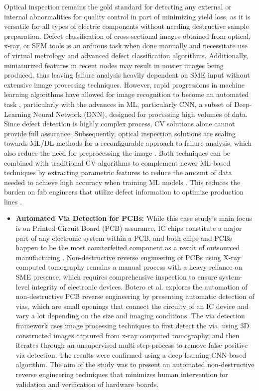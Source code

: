 Optical inspection remains the gold standard for detecting any external or internal abnormalities for quality control in part of minimizing yield loss, as it is versatile for all types of electric components without needing destructive sample preparation. Defect classification of cross-sectional images obtained from optical, x-ray, or SEM tools is an arduous task when done manually and necessitate use of virtual metrology and advanced defect classification algorithms. Additionally, miniaturized features in recent nodes may result in noisier images being produced, thus leaving failure analysis heavily dependent on SME input without extensive image processing techniques. However, rapid progressions in machine learning algorithms have allowed for image recognition to become an automated task \cite{Silva2019-bw}, particularly with the advances in ML, particularly CNN, a subset of Deep-Learning Neural Network (DNN), designed for processing high volumes of data. Since defect detection is highly complex process, CV solutions alone cannot provide full assurance. Subsequently, optical inspection solutions are scaling towards ML/DL methods for a reconfigurable approach to failure analysis, which also reduce the need for preprocessing the image \cite{Jessurun2022-vr, Yang2021-bz}. Both techniques can be combined with traditional CV algorithms to complement newer ML-based techniques by extracting parametric features to reduce the amount of data needed to achieve high accuracy when training ML models \cite{Zhao2022-ee}. This reduces the burden on fab engineers that utilize defect information to optimize production lines \cite{Peters2022-wd}.

\begin{itemize}
 \item \textbf{Automated Via Detection for PCBs:}
While this case study's main focus is on Printed Circuit Board (PCB) assurance, IC chips constitute a major part of any electronic system within a PCB, and both chips and PCBs happen to be the most counterfeited component as a result of outsourced manufacturing \cite{Sathiaseelan2021-zh}. Non-destructive reverse engineering of PCBs using X-ray computed tomography remains a 
manual process with a heavy reliance on SME presence, which requires comprehensive inspection to ensure system-level integrity of electronic devices. Botero et al. \cite{Botero2020-pl} explores the automation of non-destructive PCB reverse engineering by
presenting automatic detection of vias, which are small openings that connect the circuity of an IC device and vary a lot depending on
the size and imaging conditions. The via detection framework uses image processing techniques to first detect the via, using 3D constructed images captured from x-ray computed tomography, and then iterates through an unsupervised multi-step process to remove false-positive via detection. The results were confirmed using a deep learning CNN-based algorithm. The aim of the study was to present an automated non-destructive reverse engineering techniques that minimizes human     intervention for validation and verification of  hardware boards.
\end{itemize}

